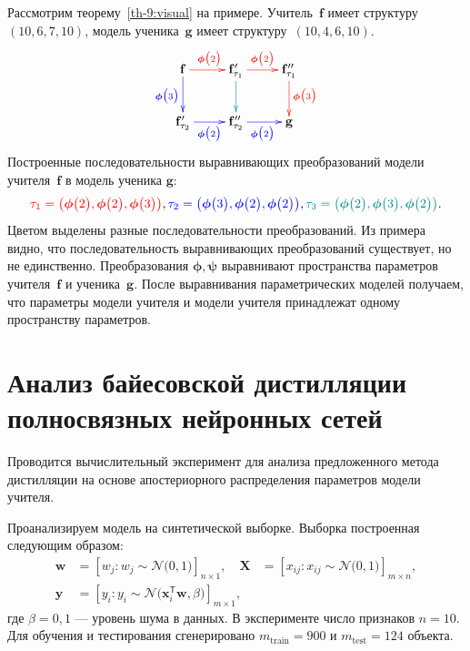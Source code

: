 Рассмотрим теорему~\ref{th-9:visual} на примере. Учитель~$\mathbf{f}$ имеет структуру~$(10, 6, 7, 10)$, модель ученика~$\mathbf{g}$ имеет структуру~$(10,4,6,10)$.
\[
\xymatrix{
\mathbf{f}\ar@[blue][d]_{\color{blue}\bm{\phi}\bigr(3\bigr)}\ar@[red][r]^{\color{red}\bm{\phi}\bigr(2\bigr)}
& 
\mathbf{f}_{\tau_1}'\ar@[darkcyan][d]\ar@[red][r]^{\color{red}\bm{\phi}\bigr(2\bigr)}
&
\mathbf{f}_{\tau_1}''\ar@[red][d]^{\color{red}\bm{\phi}\bigr(3\bigr)}
\\
\mathbf{f}_{\tau_2}'\ar@[blue][r]_{\color{blue}\bm{\phi}\bigr(2\bigr)}
& 
\mathbf{f}_{\tau_2}''\ar@[blue][r]_{\color{blue}\bm{\phi}\bigr(2\bigr)}
&
\mathbf{g}
}
\]
Построенные последовательности выравнивающих преобразований модели учителя~$\mathbf{f}$ в модель ученика $\mathbf{g}$:
\[
{\color{red}\tau_1=\left(\bm{\phi}\bigr(2\bigr), \bm{\phi}\bigr(2\bigr), \bm{\phi}\bigr(3\bigr)\right)}, {\color{blue}\tau_2=\left(\bm{\phi}\bigr(3\bigr), \bm{\phi}\bigr(2\bigr), \bm{\phi}\bigr(2\bigr)\right)}, {\color{darkcyan}\tau_3=\left(\bm{\phi}\bigr(2\bigr), \bm{\phi}\bigr(3\bigr), \bm{\phi}\bigr(2\bigr)\right)}.
\]
Цветом выделены разные последовательности преобразований.
Из примера видно, что последовательность выравнивающих преобразований существует, но не единственно. Преобразования $\bm{\phi}, \bm{\psi}$ выравнивают пространства параметров учителя~$\mathbf{f}$ и ученика~$\mathbf{g}$. После выравнивания параметрических моделей получаем, что параметры модели учителя и модели учителя принадлежат одному пространству параметров.

\section{Анализ байесовской дистилляции полносвязных нейронных сетей}
Проводится вычислительный эксперимент для анализа предложенного метода дистилляции на основе апостериорного распределения параметров модели учителя.

Проанализируем модель на синтетической выборке. Выборка построенная следующим образом:
\[
\label{ch:3:eq:ex:1}
\begin{aligned}
\mathbf{w} &= \left[w_j: w_{j}\sim \mathcal{N}\bigr(0, 1\bigr)\right]_{n\times 1}, \quad \mathbf{X} &= \left[x_{ij}: x_{ij}\sim\mathcal{N}\bigr(0, 1\bigr)\right]_{m\times n}, \\
 \mathbf{y} &= \left[y_i: y_i \sim \mathcal{N}\bigr(\mathbf{x}_i^{\mathsf{T}}\mathbf{w}, \beta\bigr)\right]_{m \times 1},
\end{aligned}
\] 
где $\beta=0{,}1$ --- уровень шума в данных. В эксперименте число признаков $n=10.$ Для обучения и тестирования сгенерировано $m_{\text{train}}=900$ и $m_{\text{test}}=124$ объекта.

